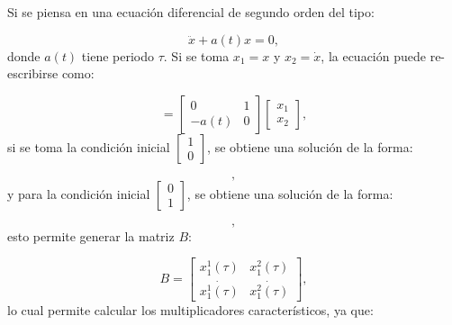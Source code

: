 \documentclass[a4paper,10pt]{report}
\begin{document}
Si se piensa en una ecuación diferencial de segundo orden del tipo:

\begin{equation}
\ddot{x} + a(t)x= 0,
\end{equation} donde $a(t)$ tiene periodo $\tau$. Si se toma $x_1 = x$ y $x_2 = \dot{x}$, la ecuación puede re-escribirse como:

\begin{equation}
[\begin{array}{c}
\dot{x_1} \\
\dot{x_2}
\end{array}] = [\begin{array}{cc}
0 & 1 \\
-a(t) & 0
\end{array}][\begin{array}{c} 
x_1 \\ 
x_2

\end{array}],
\end{equation} si se toma la condición inicial $[\begin{array}{c} 1 \\ 0 \end{array}]$, se obtiene una solución de la forma:

\begin{equation}
[\begin{array}{c}
x_1^1(t) \\
\dot{x_1^1(t)}
\end{array}],
\end{equation} y para la condición inicial $[\begin{array}{c} 0 \\ 1 \end{array}]$, se obtiene una solución de la forma:

\begin{equation}
[\begin{array}{c}
x_1^2(t) \\
\dot{x_1^2(t)}
\end{array}],
\end{equation} esto permite generar la matriz $B$:

\begin{equation}
B= [\begin{array}{cc}

x_1^1(\tau) & x_1^2(\tau) \\
\dot{x_1^1(\tau)} & \dot{x_1^2(\tau)}

\end{array}],
\end{equation} lo cual permite calcular los multiplicadores característicos, ya que:
\end{document}

